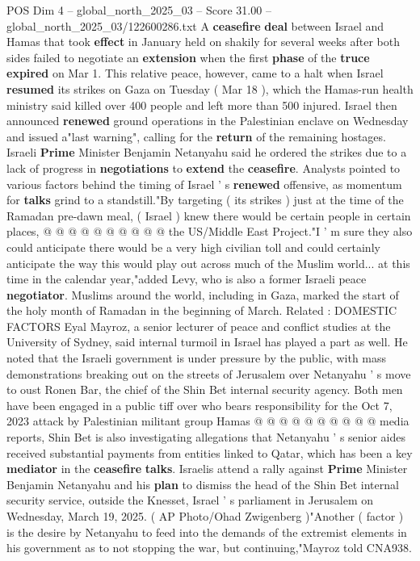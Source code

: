 \begin{textsample}{POS Dim 4 – global\_north\_2025\_03 – Score 31.00 – global\_north\_2025\_03/122600286.txt}  \label{ex:f4_pos_068}
A \textbf{ceasefire} \textbf{deal} between Israel and Hamas that took \textbf{effect} in January held on shakily for several weeks after both sides failed to negotiate an \textbf{extension} when the first \textbf{phase} of the \textbf{truce} \textbf{expired} on Mar 1.
This relative peace, however, came to a halt when Israel \textbf{resumed} its strikes on Gaza on Tuesday ( Mar 18 ), which the Hamas-run health ministry said killed over 400 people and left more than 500 injured.
Israel then announced \textbf{renewed} ground operations in the Palestinian enclave on Wednesday and issued a"last warning", calling for the \textbf{return} of the remaining hostages.
Israeli \textbf{Prime} Minister Benjamin Netanyahu said he ordered the strikes due to a lack of progress in \textbf{negotiations} to \textbf{extend} the \textbf{ceasefire}.
Analysts pointed to various factors behind the timing of Israel ' s \textbf{renewed} offensive, as momentum for \textbf{talks} grind to a standstill."By targeting ( its strikes ) just at the time of the Ramadan pre-dawn meal, ( Israel ) knew there would be certain people in certain places, @ @ @ @ @ @ @ @ @ @ the US/Middle East Project."I ' m sure they also could anticipate there would be a very high civilian toll and could certainly anticipate the way this would play out across much of the Muslim world... at this time in the calendar year,"added Levy, who is also a former Israeli peace \textbf{negotiator}.
Muslims around the world, including in Gaza, marked the start of the holy month of Ramadan in the beginning of March.
Related : DOMESTIC FACTORS Eyal Mayroz, a senior lecturer of peace and conflict studies at the University of Sydney, said internal turmoil in Israel has played a part as well.
He noted that the Israeli government is under pressure by the public, with mass demonstrations breaking out on the streets of Jerusalem over Netanyahu ' s move to oust Ronen Bar, the chief of the Shin Bet internal security agency.
Both men have been engaged in a public tiff over who bears responsibility for the Oct 7, 2023 attack by Palestinian militant group Hamas @ @ @ @ @ @ @ @ @ @ media reports, Shin Bet is also investigating allegations that Netanyahu ' s senior aides received substantial payments from entities linked to Qatar, which has been a key \textbf{mediator} in the \textbf{ceasefire} \textbf{talks}.
Israelis attend a rally against \textbf{Prime} Minister Benjamin Netanyahu and his \textbf{plan} to dismiss the head of the Shin Bet internal security service, outside the Knesset, Israel ' s parliament in Jerusalem on Wednesday, March 19, 2025. ( AP Photo/Ohad Zwigenberg )"Another ( factor ) is the desire by Netanyahu to feed into the demands of the extremist elements in his government as to not stopping the war, but continuing,"Mayroz told CNA938.

\end{textsample}
